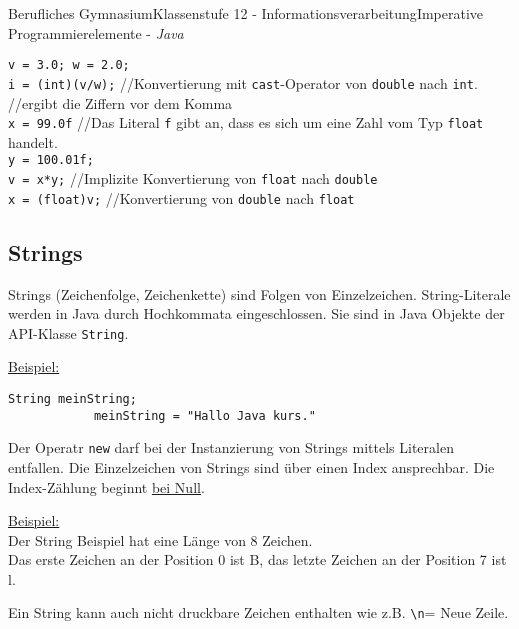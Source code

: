\documentclass[oneside,openany,headings=optiontotoc,11pt,numbers=noenddot]{article}
\begin{document}
\begin{worksheet}{Berufliches Gymnasium}{Klassenstufe 12 - Informationsverarbeitung}{Imperative Programmierelemente - \textit{Java}}
\begin{tabbing}
			\lstinline[style=JavaInputStyle]|v = 3.0; w = 2.0;|\\
			\lstinline[style=JavaInputStyle]|i = (int)(v/w);| \> //Konvertierung mit \lstinline[style=JavaInputStyle]|cast|-Operator von \lstinline[style=JavaInputStyle]|double| nach \lstinline[style=JavaInputStyle]|int|.\\
			\> //ergibt die Ziffern vor dem Komma\\
			\lstinline[style=JavaInputStyle]|x = 99.0f| \> //Das Literal \lstinline[style=JavaInputStyle]|f| gibt an, dass es sich um eine Zahl vom Typ \lstinline[style=JavaInputStyle]|float| handelt.\\
			\lstinline[style=JavaInputStyle]|y = 100.01f;|\\
			\lstinline[style=JavaInputStyle]|v = x*y;| \> //Implizite Konvertierung von \lstinline[style=JavaInputStyle]|float| nach \lstinline[style=JavaInputStyle]|double|\\
			\lstinline[style=JavaInputStyle]|x = (float)v;| \> //Konvertierung von \lstinline[style=JavaInputStyle]|double| nach \lstinline[style=JavaInputStyle]|float|
		\end{tabbing}
		\subsection{Strings}
		Strings (Zeichenfolge, Zeichenkette) sind Folgen von Einzelzeichen. String-Literale werden in Java durch Hochkommata eingeschlossen. Sie sind in Java Objekte der API-Klasse \lstinline[style=JavaInputStyle]|String|.\\
		\par\noindent
		\underline{Beispiel:}
		\begin{lstlisting}[style=JavaInputStyle]
			String meinString;
			meinString = "Hallo Java kurs."
		\end{lstlisting}
		Der Operatr \lstinline[style=JavaInputStyle]|new| darf bei der Instanzierung von Strings mittels Literalen entfallen. Die Einzelzeichen von Strings sind über einen Index ansprechbar. Die Index-Zählung beginnt \underline{bei Null}.\\
		\par\noindent
		\underline{Beispiel:}\\
		Der String \grqq{}Beispiel\grqq{} hat eine Länge von 8 Zeichen.\\
		Das erste Zeichen an der Position 0 ist \grq{}B\grq{}, das letzte Zeichen an der Position 7 ist \grq{}l\grq{}.\\
		\par\noindent
		Ein String kann auch nicht druckbare Zeichen enthalten wie z.B. \lstinline[style=JavaInputStyle]|\n|= Neue Zeile.

\end{worksheet}
\end{document}
